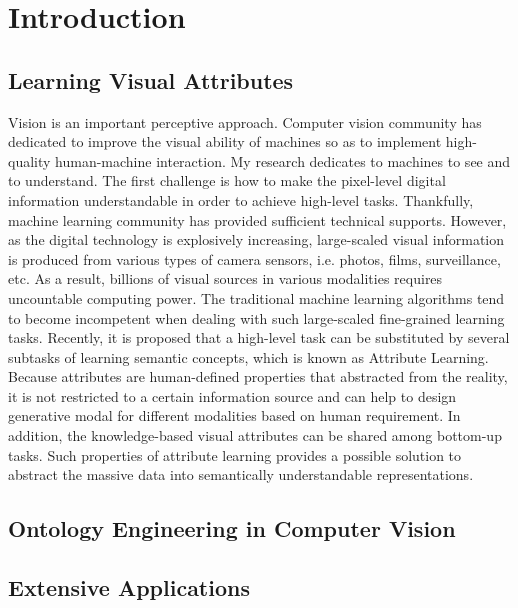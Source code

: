 \chapter{Introduction}  %

\section{Learning Visual Attributes} %

Vision is an important perceptive approach. Computer vision community has dedicated to improve the visual ability of machines so as to implement high-quality human-machine interaction. My research dedicates to machines to see and to understand. The first challenge is how to make the pixel-level digital information understandable in order to achieve high-level tasks. Thankfully, machine learning community has provided sufficient technical supports. However, as the digital technology is explosively increasing, large-scaled visual information is produced from various types of camera sensors, i.e. photos, films, surveillance, etc. As a result, billions of visual sources in various modalities requires uncountable computing power. The traditional machine learning algorithms tend to become incompetent when dealing with such large-scaled fine-grained learning tasks. Recently, it is proposed that a high-level task can be substituted by several subtasks of learning semantic concepts, which is known as Attribute Learning. Because attributes are human-defined properties that abstracted from the reality, it is not restricted to a certain information source and can help to design generative modal for different modalities based on human requirement. In addition, the knowledge-based visual attributes can be shared among bottom-up tasks. Such properties of attribute learning provides a possible solution to abstract the massive data into semantically understandable representations. \\


\section{Ontology Engineering in Computer Vision} %


\section{Extensive Applications}  %



